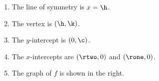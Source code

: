 \begin{solution}

\begin{minipage}{\textwidth}
\begin{minipage}{0.6\textwidth}
\begin{enumerate}[label={(\arabic*)},afterlabel=\quad]
\item The line of symmetry is $x=\h$.
\item The vertex is $(\h, \k)$.
\item The $y$-intercept is $(0, \c)$.
\item The $x$-intercepts are $(\rtwo, 0)$ and $(\rone,0)$.
\item
The graph of $f$ is shown in the right.
\end{enumerate}
\end{minipage}\hspace{-2em}
\begin{minipage}{0.5\textwidth}
\begin{center}
\end{center}
\end{minipage}
\end{minipage}
\end{solution}
